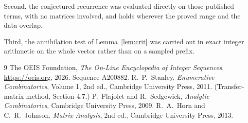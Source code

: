 \documentclass[11pt,a4paper]{article}
\theoremstyle{plain}
\theoremstyle{definition}
\begin{document}
Second, the conjectured recurrence was evaluated directly on those published terms, with no
matrices involved, and holds wherever the proved range and the data overlap.

Third, the annihilation test of Lemma~\ref{lem:crit} was carried out in exact integer
arithmetic on the whole vector rather than on a sampled prefix.

\begin{thebibliography}{9}
 The OEIS Foundation, \emph{The On-Line Encyclopedia of Integer
Sequences}, \url{https://oeis.org}, 2026. Sequence A200882.
 R.~P.~Stanley, \emph{Enumerative Combinatorics}, Volume 1, 2nd ed.,
Cambridge University Press, 2011. (Transfer-matrix method, Section 4.7.)
 P.~Flajolet and R.~Sedgewick, \emph{Analytic Combinatorics}, Cambridge
University Press, 2009.
 R.~A.~Horn and C.~R.~Johnson, \emph{Matrix Analysis}, 2nd ed., Cambridge
University Press, 2013.
\end{thebibliography}
\end{document}
